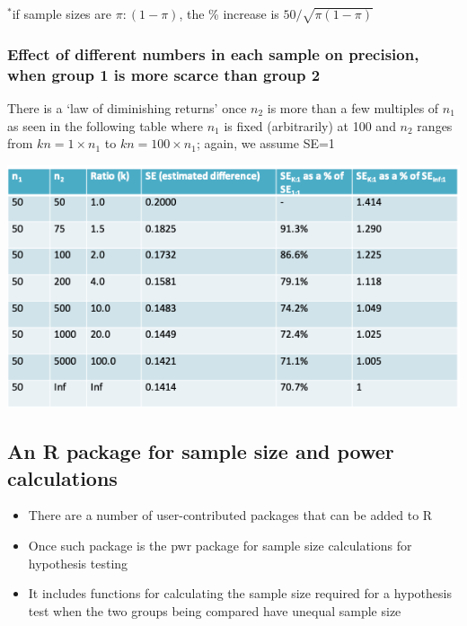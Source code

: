 \documentclass[
]{book}
\providecommand{\tightlist}{%
  \setlength{\itemsep}{0pt}\setlength{\parskip}{0pt}}
\begin{document}
\(^*\)if sample sizes are \(\pi:(1-\pi)\), the \% increase is \(50/\sqrt{\pi(1-\pi)}\)

\hypertarget{effect-of-different-numbers-in-each-sample-on-precision-when-group-1-is-more-scarce-than-group-2-1}{%
\subsubsection{Effect of different numbers in each sample on precision, when group 1 is more scarce than group 2}\label{effect-of-different-numbers-in-each-sample-on-precision-when-group-1-is-more-scarce-than-group-2-1}}

There is a `law of diminishing returns' once \(n_2\) is more than a few multiples of \(n_1\) as seen in the following table where \(n_1\) is fixed (arbitrarily) at 100 and \(n_2\) ranges from \(kn=1 \times n_1\) to \(kn=100 \times n_1\); again, we assume SE=1

\includegraphics[width=1\linewidth]{./4_76}

\hypertarget{an-r-package-for-sample-size-and-power-calculations-1}{%
\subsection{An R package for sample size and power calculations}\label{an-r-package-for-sample-size-and-power-calculations-1}}

\begin{itemize}
\tightlist
\item
  There are a number of user-contributed packages that can be added to R
\item
  Once such package is the pwr package for sample size calculations for hypothesis testing
\item
  It includes functions for calculating the sample size required for a hypothesis test when the two groups being compared have unequal sample size
\end{itemize}
\end{document}
